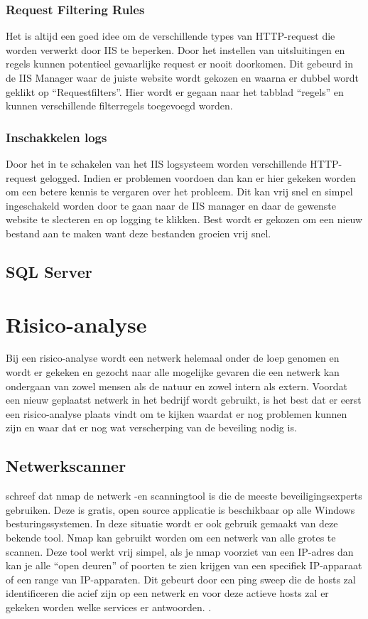 \documentclass[pdftex,a4paper,12pt]{report}
\begin{document}
\subsection{Request Filtering Rules}
Het is altijd een goed idee om de verschillende types van HTTP-request die worden verwerkt door IIS te beperken. Door het instellen van uitsluitingen en regels kunnen potentieel gevaarlijke request er nooit doorkomen. Dit gebeurd in de IIS Manager waar de juiste website wordt gekozen en waarna er dubbel wordt geklikt op "`Requestfilters"'. Hier wordt er gegaan naar het tabblad "`regels"' en kunnen verschillende filterregels toegevoegd worden.

\subsection{Inschakkelen logs}
Door het in te schakelen van het IIS logsysteem worden verschillende HTTP-request gelogged. Indien er problemen voordoen dan kan er hier gekeken worden om een betere kennis te vergaren over het probleem. Dit kan vrij snel en simpel ingeschakeld worden door te gaan naar de IIS manager en daar de gewenste website te slecteren en op logging te klikken. Best wordt er gekozen om een nieuw bestand aan te maken want deze bestanden groeien vrij snel.

\section{SQL Server}

\chapter{Risico-analyse}
Bij een risico-analyse wordt een netwerk helemaal onder de loep genomen en wordt er gekeken en gezocht naar alle mogelijke gevaren die een netwerk kan ondergaan van zowel mensen als de natuur en zowel intern als extern. Voordat een nieuw geplaatst netwerk in het bedrijf wordt gebruikt, is het best dat er eerst een risico-analyse plaats vindt om te kijken waardat er nog problemen kunnen zijn en waar dat er nog wat verscherping van de beveiling nodig is.

\section{Netwerkscanner}
\cite{Jackson2010} schreef dat nmap de netwerk -en scanningtool is die de meeste beveiligingsexperts gebruiken. Deze is gratis, open source applicatie is beschikbaar op alle Windows besturingssystemen. In deze situatie wordt er ook gebruik gemaakt van deze bekende tool. Nmap kan gebruikt worden om een netwerk van alle grotes te scannen. Deze tool werkt vrij simpel, als je nmap voorziet van een IP-adres dan kan je alle "`open deuren"' of poorten te zien krijgen van een specifiek IP-apparaat of een range van IP-apparaten. Dit gebeurt door een ping sweep die de hosts zal identificeren die acief zijn op een netwerk en voor deze actieve hosts zal er gekeken worden welke services er antwoorden. \citep{Messer2007}. \newline
\end{document}
